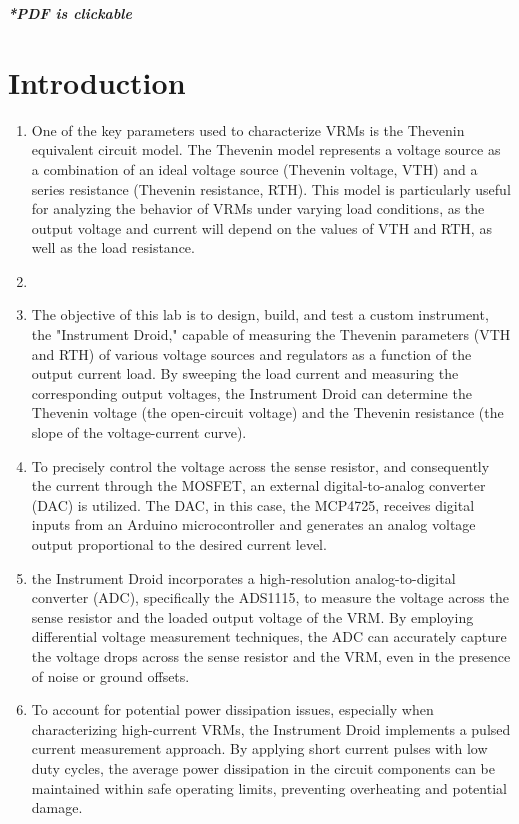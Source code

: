 \documentclass[a4paper,11pt]{article}%
\begin{document}


\pagebreak

\tableofcontents
\listoffigures
\listoftables
\vfill
\begin{center}
	\textbf{\textit{*PDF is clickable}}
\end{center}

\pagebreak

\section{Introduction}
\begin{enumerate}
	\item One of the key parameters used to characterize VRMs is the Thevenin equivalent circuit model. The Thevenin model represents a voltage source as a combination of an ideal voltage source (Thevenin voltage, VTH) and a series resistance (Thevenin resistance, RTH). This model is particularly useful for analyzing the behavior of VRMs under varying load conditions, as the output voltage and current will depend on the values of VTH and RTH, as well as the load resistance.
	\item 
	\item The objective of this lab is to design, build, and test a custom instrument, the "Instrument Droid," capable of measuring the Thevenin parameters (VTH and RTH) of various voltage sources and regulators as a function of the output current load. By sweeping the load current and measuring the corresponding output voltages, the Instrument Droid can determine the Thevenin voltage (the open-circuit voltage) and the Thevenin resistance (the slope of the voltage-current curve).

	\item To precisely control the voltage across the sense resistor, and consequently the current through the MOSFET, an external digital-to-analog converter (DAC) is utilized. The DAC, in this case, the MCP4725, receives digital inputs from an Arduino microcontroller and generates an analog voltage output proportional to the desired current level.

	\item the Instrument Droid incorporates a high-resolution analog-to-digital converter (ADC), specifically the ADS1115, to measure the voltage across the sense resistor and the loaded output voltage of the VRM. By employing differential voltage measurement techniques, the ADC can accurately capture the voltage drops across the sense resistor and the VRM, even in the presence of noise or ground offsets.

	\item To account for potential power dissipation issues, especially when characterizing high-current VRMs, the Instrument Droid implements a pulsed current measurement approach. By applying short current pulses with low duty cycles, the average power dissipation in the circuit components can be maintained within safe operating limits, preventing overheating and potential damage.
\end{enumerate}
\end{document}
